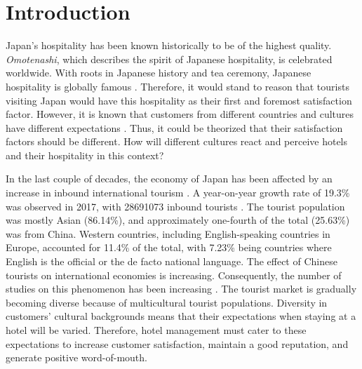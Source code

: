 \documentclass[smallextended,natbib]{svjour3}       %
\begin{document}
\linenumbers

\section{Introduction}\label{intro}

  Japan’s hospitality has been known historically to be of the highest quality. \textit{Omotenashi}, which describes the spirit of Japanese hospitality, is celebrated worldwide. With roots in Japanese history and tea ceremony, Japanese hospitality is globally famous \cite[][]{al2015characteristics}. Therefore, it would stand to reason that tourists visiting Japan would have this hospitality as their first and foremost satisfaction factor. However, it is known that customers from different countries and cultures have different expectations \cite[][]{engel1990}. Thus, it could be theorized that their satisfaction factors should be different. How will different cultures react and perceive hotels and their hospitality in this context?  

  In the last couple of decades, the economy of Japan has been affected by an increase in inbound international tourism \cite[][]{jones2009}. A year-on-year growth rate of 19.3\% was observed in 2017, with \num[group-separator={,}]{28691073} inbound tourists \cite[][]{jnto2003-2019}. The tourist population was mostly Asian (86.14\%), and approximately one-fourth of the total (25.63\%) was from China. Western countries, including English-speaking countries in Europe, accounted for 11.4\% of the total, with 7.23\% being countries where English is the official or the de facto national language. The effect of Chinese tourists on international economies is increasing. Consequently, the number of studies on this phenomenon has been increasing \cite[][]{sun2017}. The tourist market is gradually becoming diverse because of multicultural tourist populations. Diversity in customers' cultural backgrounds means that their expectations when staying at a hotel will be varied. Therefore, hotel management must cater to these expectations to increase customer satisfaction, maintain a good reputation, and generate positive word-of-mouth.
\end{document}
